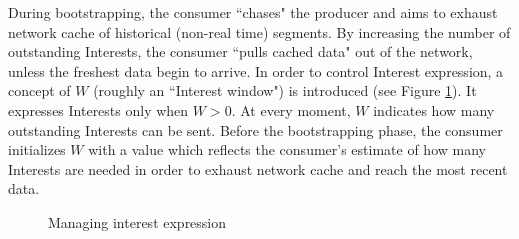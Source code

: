 During bootstrapping, the consumer ``chases" the producer and aims to exhaust network cache of historical (non-real time) segments. By increasing the number of outstanding Interests, the consumer ``pulls cached data" out of the network, unless the freshest data begin to arrive. In order to control Interest expression, a concept of $W$ (roughly an ``Interest window") is introduced (see Figure \ref{fig:w-concept}). It expresses Interests only when $W > 0$. At every moment, $W$ indicates how many outstanding Interests can be sent. Before the bootstrapping phase, the consumer initializes $W$ with a value which reflects the consumer's estimate of how many Interests are needed in order to exhaust network cache and reach the most recent data. 

\begin{figure}[t!]
\centering


\caption{Managing interest expression}
\label{fig:w-concept}
\end{figure}




